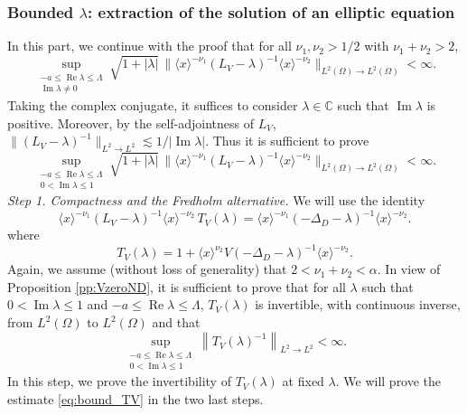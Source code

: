 \documentclass[10pt,leqno]{amsart}
\DeclareMathOperator{\im}{Im} %
\DeclareMathOperator{\re}{Re} %
\theoremstyle{definition}%
\theoremstyle{remark}
\numberwithin{equation}{section}
\newcommand{\C}{\mathbb{C}}
\renewcommand{\^}{\widehat}%
\begin{document}
\subsubsection{Bounded $\lambda$: extraction of the solution of an elliptic equation}
\label{sub:elliptic}
In this part, we continue with the proof that for all  $\nu_1,\nu_2>1/2$ with $\nu_1+\nu_2>2$, 
\begin{equation}
\label{eq:bounded_lambda'}
\sup_{\substack{-a\leqslant \re \lambda \leqslant \Lambda\\ \im \lambda \neq 0} }
\sqrt{1+\lvert \lambda\rvert}\,
\bigl\lVert \langle x\rangle^{-\nu_1}(L_V-\lambda)^{-1}\langle x\rangle^{-\nu_2}\bigr\rVert_{L^2(\Omega)\to L^2(\Omega)}<\infty.
\end{equation} 
Taking the complex conjugate, it suffices to consider $\lambda\in\C$ such that $\im \lambda  $ is  positive. 
Moreover, by the self-adjointness of $L_V$, $\|(L_V-\lambda)^{-1}\|_{L^2\to L^2}\lesssim 1/|\im \lambda|$. 
Thus it is sufficient to prove
\begin{equation}
\label{eq:bounded_lambda}
\sup_{\substack{-a\leqslant \re \lambda \leqslant \Lambda \\ 0<\im \lambda \leq 1}  }
\sqrt{1+\lvert \lambda\rvert}\,
\bigl\lVert \langle x\rangle^{-\nu_1}(L_V-\lambda)^{-1}\langle x\rangle^{-\nu_2}\bigr\rVert_{L^2(\Omega)\to L^2(\Omega)}<\infty.
\end{equation} 
\noindent\emph{Step 1. Compactness and the Fredholm alternative.} 	
We will use the identity
\begin{equation*}
\langle x\rangle^{-\nu_1}(L_V-\lambda)^{-1}\langle x \rangle^{-\nu_2}\,T_V(\lambda)
=\langle x\rangle^{-\nu_1}(-\Delta_D-\lambda)^{-1}\langle x\rangle^{-\nu_2}.  
\end{equation*}
where 
$$T_V(\lambda)=1+ \langle x\rangle^{\nu_2} V\left(-\Delta_D-\lambda\right)^{-1}\langle x\rangle^{-\nu_2}.$$
Again, we assume (without loss of generality) that $2<\nu_1+\nu_2<\alpha$.
In view of Proposition \ref{pp:VzeroND}, it is sufficient to prove that for all $\lambda$ such that $0<\im \lambda\leq 1$ and $-a\leq \re \lambda\leq \Lambda$, $T_V(\lambda)$ is invertible, with continuous inverse, from $L^2(\Omega)$ to $L^2(\Omega)$ and that 
\begin{equation}
\label{eq:bound_TV}
\sup_{\substack{-a\leqslant \re \lambda\leqslant \Lambda \\ 0<\im \lambda\leq 1}} \left\|T_V(\lambda)^{-1}\right\|_{L^2\to L^2}<\infty.
\end{equation}
In this step, we prove the invertibility of $T_V(\lambda)$ at fixed $\lambda$. We will prove the estimate \eqref{eq:bound_TV} in the two last steps. 
\end{document}
